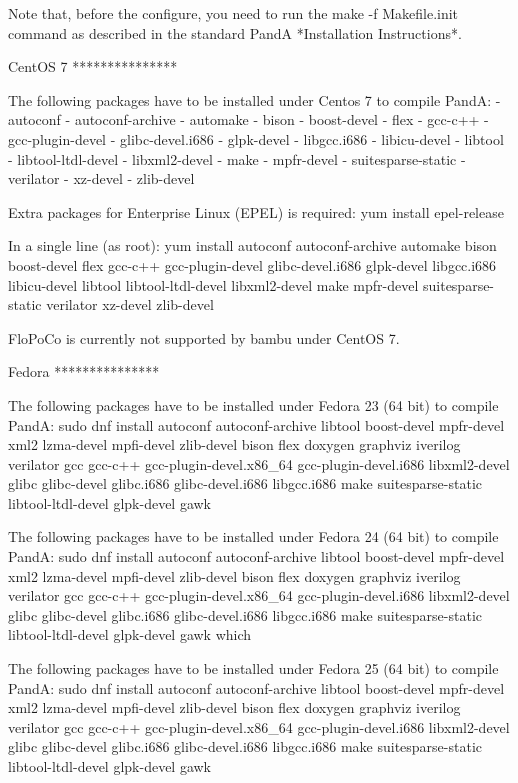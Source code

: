 \begin{DoxyVerbInclude}
Note that, before the configure, you need to run the make -f Makefile.init command as described in the standard PandA *Installation Instructions*.

CentOS 7
***************

The following packages have to be installed under Centos 7 to compile PandA:
- autoconf
- autoconf-archive
- automake
- bison
- boost-devel
- flex
- gcc-c++
- gcc-plugin-devel
- glibc-devel.i686
- glpk-devel
- libgcc.i686
- libicu-devel
- libtool
- libtool-ltdl-devel
- libxml2-devel
- make
- mpfr-devel
- suitesparse-static
- verilator
- xz-devel
- zlib-devel

Extra packages for Enterprise Linux (EPEL) is required:
yum install epel-release

In a single line (as root):
yum install autoconf autoconf-archive automake bison boost-devel flex gcc-c++ gcc-plugin-devel glibc-devel.i686 glpk-devel libgcc.i686 libicu-devel libtool libtool-ltdl-devel libxml2-devel make mpfr-devel suitesparse-static verilator xz-devel zlib-devel

FloPoCo is currently not supported by bambu under CentOS 7.

Fedora
***************

The following packages have to be installed under Fedora 23 (64 bit) to compile PandA:
sudo dnf install autoconf autoconf-archive libtool boost-devel mpfr-devel xml2 lzma-devel mpfi-devel zlib-devel bison flex doxygen graphviz iverilog verilator gcc gcc-c++ gcc-plugin-devel.x86_64 gcc-plugin-devel.i686 libxml2-devel glibc glibc-devel glibc.i686 glibc-devel.i686 libgcc.i686 make suitesparse-static libtool-ltdl-devel glpk-devel gawk

The following packages have to be installed under Fedora 24 (64 bit) to compile PandA:
sudo dnf install autoconf autoconf-archive libtool boost-devel mpfr-devel xml2 lzma-devel mpfi-devel zlib-devel bison flex doxygen graphviz iverilog verilator gcc gcc-c++ gcc-plugin-devel.x86_64 gcc-plugin-devel.i686 libxml2-devel glibc glibc-devel glibc.i686 glibc-devel.i686 libgcc.i686 make suitesparse-static libtool-ltdl-devel glpk-devel gawk which

The following packages have to be installed under Fedora 25 (64 bit) to compile PandA:
sudo dnf install autoconf autoconf-archive libtool boost-devel mpfr-devel xml2 lzma-devel mpfi-devel zlib-devel bison flex doxygen graphviz iverilog verilator gcc gcc-c++ gcc-plugin-devel.x86_64 gcc-plugin-devel.i686 libxml2-devel glibc glibc-devel glibc.i686 glibc-devel.i686 libgcc.i686 make suitesparse-static libtool-ltdl-devel glpk-devel gawk


\end{DoxyVerbInclude}
